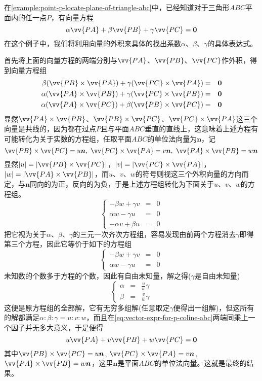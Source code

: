 \begin{example}
  \label{example:outer-product-coefficient-pa-pb-pc}
  在\autoref{example:point-p-locate-plane-of-triangle-abc}中，已经知道对于三角形$ABC$平面内的任一点$P$，有向量方程
  \begin{equation}
    \label{eq:vector-expr-for-p-coline-abc}
   \alpha \vv{PA} + \beta \vv{PB} +\gamma \vv{PC} = \bm{0} 
  \end{equation}
  在这个例子中，我们将利用向量的外积来具体的找出系数$\alpha$、$\beta$、$\gamma$的具体表达式。

  首先将上面的向量方程的两端分别与$\vv{PA}$、$\vv{PB}$、$\vv{PC}$作外积，得到向量方程组
  \begin{eqnarray*}
    \beta (\vv{PB}\times\vv{PA}) + \gamma (\vv{PC}\times\vv{PA}) & = & \bm{0} \\
    \alpha (\vv{PA}\times\vv{PB}) + \gamma (\vv{PC}\times\vv{PB}) & = & \bm{0} \\
    \alpha (\vv{PA}\times\vv{PC}) + \beta (\vv{PB}\times\vv{PC}) & = & \bm{0}
  \end{eqnarray*}
  显然$\vv{PA}\times\vv{PB}$、$\vv{PB}\times\vv{PC}$、$\vv{PC}\times\vv{PA}$这三个向量是共线的，因为都在过点$P$且与平面$ABC$垂直的直线上，这意味着上述方程有可能转化为关于实数的方程组，任取平面$ABC$的单位法向量为$\bm{n}$，记
  \[ \vv{PB}\times\vv{PC}=u\bm{n}, \  \vv{PC}\times\vv{PA} = v\bm{n}, \  \vv{PA}\times\vv{PB}=w\bm{n} \]
  显然$|u|=|\vv{PB}\times\vv{PC}|$，$|v|=|\vv{PC}\times\vv{PA}|$，$|w|=|\vv{PA}\times\vv{PB}|$，而$u$、$v$、$w$的符号则视这三个外积向量的方向而定，与$\bm{n}$同向的为正，反向的为负，于是上述方程组转化为下面关于$u$、$v$、$w$的方程组。
  \[
    \left\{
  \begin{array}{lll}
    -\beta w + \gamma v & = & 0 \\
    \alpha w - \gamma u & = & 0 \\
    - \alpha v + \beta u & = & 0
  \end{array}
  \right.
  \]
  把它视为关于$\alpha$、$\beta$、$\gamma$的三元一次齐次方程组，容易发现由前两个方程消去$\gamma$即得第三个方程，因此它等价于如下的方程组
   \[
    \left\{
  \begin{array}{lll}
    -\beta w + \gamma v & = & 0 \\
    \alpha w - \gamma u & = & 0 
  \end{array}
  \right.
  \]
  未知数的个数多于方程的个数，因此有自由未知量，解之得($\gamma$是自由未知量)
   \[
    \left\{
  \begin{array}{lll}
    \alpha & = & \frac{u}{w} \gamma \\
    \beta & = & \frac{v}{w} \gamma
  \end{array}
  \right.
  \]
  这便是原方程组的全部解，它有无穷多组解(任意取定$\gamma$便得出一组解)，但这所有的解都满足$\alpha:\beta:\gamma=u:v:w$，而且在\autoref{eq:vector-expr-for-p-coline-abc}两端同乘上一个因子并无多大意义，于是便得
  \[ u \vv{PA} + v \vv{PB} + w \vv{PC} = \bm{0} \]
  其中$\vv{PB}\times\vv{PC}=u\bm{n}$, $\vv{PC}\times\vv{PA}=v\bm{n}$, $\vv{PA}\times\vv{PB}=w\bm{n}$，这里$\bm{n}$是平面$ABC$的单位法向量。这就是最终的结果。


\end{example}
